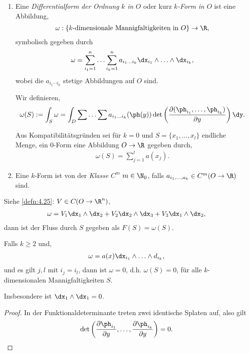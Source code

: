 \begin{defn}
\label{defn:4.27}
\begin{enumerate}[label=\arabic{*}.)]
\item Eine \emph{Differentialform der Ordnung $k$ in $O$} oder kurz
\emph{$k$-Form in $O$} ist eine Abbildung,
\begin{align*}
\omega : \left\{k\text{-dimensionale Mannigfaltigkeiten in } O\right\}\to \R,
\end{align*}
symbolisch gegeben durch
\begin{align*}
\omega = \sum\limits_{i_1=1}^n \ldots \sum\limits_{i_k=1}^n a_{i_1 \ldots i_k}
\dx_{i_1} \land \ldots \land \dx_{i_k},
\end{align*}
wobei die $a_{i_1\cdots i_k}$ stetige Abbildungen auf $O$ sind.

Wir definieren,
\begin{align*}
\omega(S) := \int_S \omega = \int_D \sum\ldots\sum  a_{i_1 \ldots i_k}(\ph(y))
\det \left( \frac{\partial(\ph_{i_1},\ldots,\ph_{i_k})}{\partial y} \right) \dy.
\end{align*}

Aus Kompatibilitätsgründen sei für $k=0$ und $S=\{x_1,\ldots,x_l\}$ endliche
Menge, ein $0$-Form eine Abbildung $O\to\R$ gegeben durch,
\begin{align*}
\omega(S) = \sum\limits_{j=1}^l a(x_j).
\end{align*}
\item Eine $k$-Form ist von der \emph{Klasse $C^m$} $m\in\N_0$, falls
$a_{i_1,\ldots,a_k}\in C^m(O\to\R)$ sind.\fishhere
\end{enumerate}
\end{defn}

\begin{bsp}
\label{bsp:4.28}
Siehe \ref{defn:4.25}: $V\in C(O\to\R^n)$,
\begin{align*}
\omega = V_1 \dx_1\land \dx_2 + V_2 \dx_2\land\dx_3 + V_3\dx_1\land\dx_2,
\end{align*}
dann ist der Fluss durch $S$ gegeben als $F(S) = \omega(S)$.\bsphere
\end{bsp}

\begin{cor}
\label{cor:4.29}
Falls $k\ge 2$ und,
\begin{align*}
\omega = a(x) \dx_{i_1} \land \ldots \land d_{i_k},
\end{align*}
und es gilt $j,l$ mit $i_j = i_l$, dann ist $\omega = 0$, d.h. $\omega(S) = 0$,
für alle $k$-dimensionalen Mannigfaltigkeiten $S$.

Insbesondere ist $\dx_1\land \dx_1 = 0$.\fishhere
\end{cor}
\begin{proof}
In der Funktionaldeterminante treten zwei identische Splaten auf, also gilt
\begin{align*}
\det\left(\frac{\partial \ph_{i_1}}{\partial y},\ldots,\frac{\partial
\ph_{i_k}}{\partial y} \right) = 0.\qedhere
\end{align*}
\end{proof}


